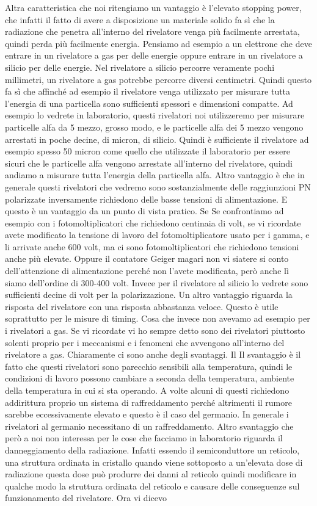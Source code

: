 Altra caratteristica che noi ritengiamo un vantaggio è l'elevato stopping power, che infatti il fatto di avere a disposizione un materiale solido fa sì che la radiazione che penetra all'interno del rivelatore venga più facilmente arrestata, quindi perda più facilmente energia. Pensiamo ad esempio a un elettrone che deve entrare in un rivelatore a gas per delle energie oppure entrare in un rivelatore a silicio per delle energie. Nel rivelatore a silicio percorre veramente pochi millimetri, un rivelatore a gas potrebbe percorre diversi centimetri. Quindi questo fa sì che affinché ad esempio il rivelatore venga utilizzato per misurare tutta l'energia di una particella sono sufficienti spessori e dimensioni compatte. Ad esempio lo vedrete in laboratorio, questi rivelatori noi utilizzeremo per misurare particelle alfa da 5 mezzo, grosso modo, e le particelle alfa dei 5 mezzo vengono arrestati in poche decine, di micron, di silicio. Quindi è sufficiente il rivelatore ad esempio spesso 50 micron come quello che utilizzate il laboratorio per essere sicuri che le particelle alfa vengono arrestate all'interno del rivelatore, quindi andiamo a misurare tutta l'energia della particella alfa. Altro vantaggio è che in generale questi rivelatori che vedremo sono sostanzialmente delle raggiunzioni PN polarizzate inversamente richiedono delle basse tensioni di alimentazione. E questo è un vantaggio da un punto di vista pratico. Se Se confrontiamo ad esempio con i fotomoltiplicatori che richiedono centinaia di volt, se vi ricordate avete modificato la tensione di lavoro del fotomoltiplicatore usato per i gamma, e li arrivate anche 600 volt, ma ci sono fotomoltiplicatori che richiedono tensioni anche più elevate. Oppure il contatore Geiger magari non vi siatere si conto dell'attenzione di alimentazione perché non l'avete modificata, però anche lì siamo dell'ordine di 300-400 volt. Invece per il rivelatore al silicio lo vedrete sono sufficienti decine di volt per la polarizzazione. Un altro vantaggio riguarda la risposta del rivelatore con una risposta abbastanza veloce. Questo è utile soprattutto per le misure di timing. Cosa che invece non avevamo ad esempio per i rivelatori a gas. Se vi ricordate vi ho sempre detto sono dei rivelatori piuttosto solenti proprio per i meccanismi e i fenomeni che avvengono all'interno del rivelatore a gas. Chiaramente ci sono anche degli svantaggi. Il Il svantaggio è il fatto che questi rivelatori sono parecchio sensibili alla temperatura, quindi le condizioni di lavoro possono cambiare a seconda della temperatura, ambiente della temperatura in cui si sta operando. A volte alcuni di questi richiedono addirittura proprio un sistema di raffreddamento perché altrimenti il rumore sarebbe eccessivamente elevato e questo è il caso del germanio. In generale i rivelatori al germanio necessitano di un raffreddamento. Altro svantaggio che però a noi non interessa per le cose che facciamo in laboratorio riguarda il danneggiamento della radiazione. Infatti essendo il semiconduttore un reticolo, una struttura ordinata in cristallo quando viene sottoposto a un'elevata dose di radiazione questa dose può produrre dei danni al reticolo quindi modificare in qualche modo la struttura ordinata del reticolo e causare delle conseguenze sul funzionamento del rivelatore. Ora vi dicevo 
